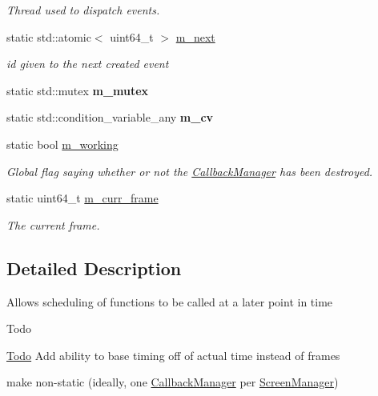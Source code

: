 \begin{DoxyCompactItemize}
\begin{DoxyCompactList}\small\item\em Thread used to dispatch events. \end{DoxyCompactList}\item 
\mbox{\label{classnta_1_1CallbackManager_a714aa329a54538ec5bda528fa3a3ab7f}} 
static std\+::atomic$<$ uint64\+\_\+t $>$ \hyperlink{classnta_1_1CallbackManager_a714aa329a54538ec5bda528fa3a3ab7f}{m\+\_\+next}
\begin{DoxyCompactList}\small\item\em id given to the next created event \end{DoxyCompactList}\item 
\mbox{\label{classnta_1_1CallbackManager_a56903bee3075ab191f598e36438d6b50}} 
static std\+::mutex {\bfseries m\+\_\+mutex}
\item 
\mbox{\label{classnta_1_1CallbackManager_afa5d7642112c791dcfef35d78aff4d09}} 
static std\+::condition\+\_\+variable\+\_\+any {\bfseries m\+\_\+cv}
\item 
\mbox{\label{classnta_1_1CallbackManager_a20cd08f864fd62edbd68f5f309be5c30}} 
static bool \hyperlink{classnta_1_1CallbackManager_a20cd08f864fd62edbd68f5f309be5c30}{m\+\_\+working}
\begin{DoxyCompactList}\small\item\em Global flag saying whether or not the \hyperlink{classnta_1_1CallbackManager}{Callback\+Manager} has been destroyed. \end{DoxyCompactList}\item 
\mbox{\label{classnta_1_1CallbackManager_a69bbc2e4ac29aca06d09b2466b6769c2}} 
static uint64\+\_\+t \hyperlink{classnta_1_1CallbackManager_a69bbc2e4ac29aca06d09b2466b6769c2}{m\+\_\+curr\+\_\+frame}
\begin{DoxyCompactList}\small\item\em The current frame. \end{DoxyCompactList}\end{DoxyCompactItemize}


\subsection{Detailed Description}
Allows scheduling of functions to be called at a later point in time \begin{DoxyRefDesc}{Todo}
\item[\hyperlink{todo__todo000001}{Todo}]Add ability to base timing off of actual time instead of frames 

make non-\/static (ideally, one \hyperlink{classnta_1_1CallbackManager}{Callback\+Manager} per \hyperlink{classnta_1_1ScreenManager}{Screen\+Manager}) \end{DoxyRefDesc}


